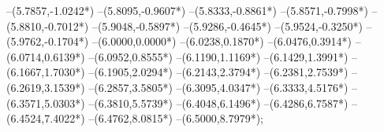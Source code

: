{	--(5.7857,{-1.0242*\yskala})
	--(5.8095,{-0.9607*\yskala})
	--(5.8333,{-0.8861*\yskala})
	--(5.8571,{-0.7998*\yskala})
	--(5.8810,{-0.7012*\yskala})
	--(5.9048,{-0.5897*\yskala})
	--(5.9286,{-0.4645*\yskala})
	--(5.9524,{-0.3250*\yskala})
	--(5.9762,{-0.1704*\yskala})
	--(6.0000,{0.0000*\yskala})
	--(6.0238,{0.1870*\yskala})
	--(6.0476,{0.3914*\yskala})
	--(6.0714,{0.6139*\yskala})
	--(6.0952,{0.8555*\yskala})
	--(6.1190,{1.1169*\yskala})
	--(6.1429,{1.3991*\yskala})
	--(6.1667,{1.7030*\yskala})
	--(6.1905,{2.0294*\yskala})
	--(6.2143,{2.3794*\yskala})
	--(6.2381,{2.7539*\yskala})
	--(6.2619,{3.1539*\yskala})
	--(6.2857,{3.5805*\yskala})
	--(6.3095,{4.0347*\yskala})
	--(6.3333,{4.5176*\yskala})
	--(6.3571,{5.0303*\yskala})
	--(6.3810,{5.5739*\yskala})
	--(6.4048,{6.1496*\yskala})
	--(6.4286,{6.7587*\yskala})
	--(6.4524,{7.4022*\yskala})
	--(6.4762,{8.0815*\yskala})
	--(6.5000,{8.7979*\yskala});
}
